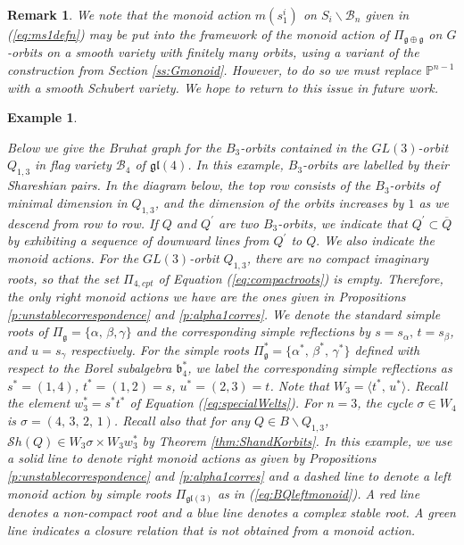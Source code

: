 \documentclass[12pt]{amsart}
\numberwithin{equation}{section}
\newtheorem{rem}[thm]{Remark}
\newtheorem{exam}[thm]{Example}
\newcommand{\cW}{{ W}}
\newcommand{\fg}{\mbox{${\mathfrak g}$}}
\newcommand{\fb}{\mbox{${\mathfrak b}$}}
\newcommand{\PR}{\mbox{${\mathbb P}$}}
\newcommand{\fgl}{\mathfrak{gl}}
\newcommand{\B}{\mathcal{B}}
\newcommand{\Sh}{\mathcal{S}h}
\begin{document}

\begin{rem} We note that the monoid action $m(s_1^{i})$ on $S_{i}\backslash \B_{n}$ given in (\ref{eq:ms1defn}) may be put into the framework of the monoid action of $\Pi_{\fg \oplus \fg}$ on $G$-orbits on a smooth variety with finitely many orbits, using a variant of the construction from Section \ref{ss:Gmonoid}.  However, to do so we must replace $\PR^{n-1}$ with a smooth Schubert variety.  We hope to return to this issue in future work. 
\end{rem}

 \begin{exam}\label{ex:Q13orbits}
 
 Below we give the Bruhat graph for the $B_{3}$-orbits contained in the $GL(3)$-orbit $Q_{1,3}$ in flag variety $\B_{4}$ of $\fgl(4)$.  In this example, $B_{3}$-orbits are labelled by their Shareshian pairs.  In the diagram below, the top row consists of the $B_{3}$-orbits of minimal dimension in $Q_{1,3}$, and the dimension of the orbits increases by $1$ as we descend from row to row.   If $Q$ and $Q^{\prime}$ are two $B_{3}$-orbits, we indicate that $Q^{\prime} \subset \overline{Q}$ by exhibiting a sequence of downward lines from $Q^{\prime}$ to $Q.$  We also indicate the monoid actions. 
 For the $GL(3)$-orbit $Q_{1,3}$, there are no compact imaginary roots, so that the set $\Pi_{4,cpt}$ of Equation (\ref{eq:compactroots}) is empty.  Therefore, the only right monoid actions we have are the ones given in Propositions \ref{p:unstablecorrespondence} and \ref{p:alpha1corres}.  We denote the standard simple roots of $\Pi_{\fg}=\{\alpha,\, \beta,\gamma\}$ and the corresponding simple reflections by $s=s_{\alpha},\, t=s_{\beta}$, and $u=s_{\gamma}$ respectively.  
 For the simple roots $\Pi_{\fg}^{*}=\{\alpha^{*},\, \beta^{*},\, \gamma^{*}\}$ defined with respect to the Borel subalgebra $\fb^{*}_{4}$, we label the corresponding simple reflections as $s^{*}=(1,4)$, $t^{*}=(1,2)=s$, $u^{*}=(2,3)=t$.  Note that ${\cW}_{3}=\langle t^{*},\, u^{*}\rangle$.  Recall the element $w_{3}^{*}=s^{*}t^{*}$ of Equation (\ref{eq:specialWelts}).  For $n=3$,  the cycle $\sigma\in {\cW}_{4}$ is $\sigma=(4,\,3,\, 2,\, 1)$.  Recall also that for any $Q\in B\backslash Q_{1,3}$, $\Sh(Q)\in {\cW}_{3}\sigma \times {\cW}_{3}w_{3}^{*}$ by Theorem \ref{thm:ShandKorbits}.  In this example, we use a solid line to denote right monoid actions as given by Propositions \ref{p:unstablecorrespondence} and \ref{p:alpha1corres} and a dashed line to denote a left monoid action by simple roots $\Pi_{\fgl(3)}$ as in (\ref{eq:BQleftmonoid}).   A red line denotes a non-compact root and a blue line denotes a complex stable root.  A green line
indicates a closure relation that is not obtained from a monoid action. 
 

\end{exam}
\end{document}
